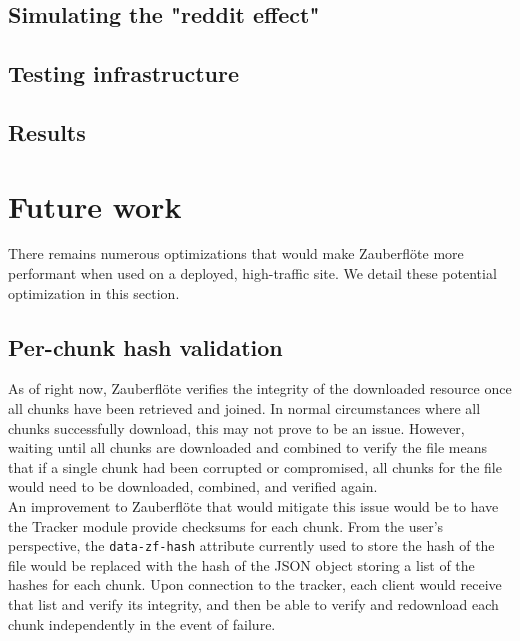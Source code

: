 \documentclass[letterpaper,twocolumn,10pt]{article}
\newcommand{\zbf}{Zauberfl\"{o}te\xspace}
\begin{document}

\subsection{Simulating the "reddit effect"}


\subsection{Testing infrastructure}


\subsection{Results}

\section{Future work}

There remains numerous optimizations that would make \zbf more performant
when used on a deployed, high-traffic site. We detail these potential optimization
in this section.

\subsection{Per-chunk hash validation}
As of right now, \zbf verifies the integrity of the downloaded resource once all
chunks have been retrieved and joined. In normal circumstances where all chunks
successfully download, this may not prove to be an issue. However, waiting until
all chunks are downloaded and combined to verify the file means that if a single
chunk had been corrupted or compromised, all chunks for the file would need to be
downloaded, combined, and verified again. \\

An improvement to \zbf that would mitigate this issue would be to have the Tracker
module provide checksums for each chunk. From the user's perspective, the
\texttt{data-zf-hash} attribute currently used to store the hash of the file
would be replaced with the hash of the JSON object storing a list of the hashes
for each chunk. Upon connection to the tracker, each client would receive that
list and verify its integrity, and then be able to verify and redownload each chunk
independently in the event of failure.
\end{document}
